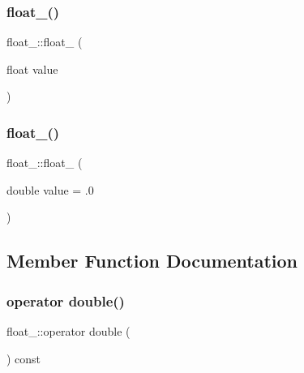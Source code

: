 \subsubsection{\texorpdfstring{float\_()}{float\_()}\hspace{0.1cm}{\footnotesize\ttfamily [1/2]}}
{\footnotesize\ttfamily float\+\_\+\+::float\+\_\+ (\begin{DoxyParamCaption}\item[{float}]{value }\end{DoxyParamCaption})\hspace{0.3cm}{\ttfamily [inline]}}

\mbox{\label{classfloat___ab7d3e2fa041e2aa97a415b256875370f}} 
\subsubsection{\texorpdfstring{float\_()}{float\_()}\hspace{0.1cm}{\footnotesize\ttfamily [2/2]}}
{\footnotesize\ttfamily float\+\_\+\+::float\+\_\+ (\begin{DoxyParamCaption}\item[{double}]{value = {\ttfamily .0} }\end{DoxyParamCaption})\hspace{0.3cm}{\ttfamily [inline]}}



\subsection{Member Function Documentation}
\mbox{\label{classfloat___a52be34dd629fc1f857de0cc72cb4e15c}} 
\subsubsection{\texorpdfstring{operator double()}{operator double()}}
{\footnotesize\ttfamily float\+\_\+\+::operator double (\begin{DoxyParamCaption}{ }\end{DoxyParamCaption}) const\hspace{0.3cm}{\ttfamily [inline]}}

\mbox{\label{classfloat___ab4cf97a2b358f2ba95564d43e56ceb1f}} 
